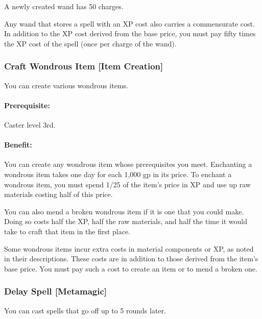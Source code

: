 A newly created wand has 50 charges.

Any wand that stores a spell with an XP cost also carries a commensurate cost. 
In addition to the XP cost derived from the base price, you must pay fifty times the XP cost of the spell (once per charge of the wand).

\subsubsection[Craft Wondrous Item]{Craft Wondrous Item [Item Creation]}
\label{Feat:CraftWondrousItem}
You can create various wondrous items.

\paragraph{Prerequisite:} Caster level 3rd.

\paragraph{Benefit:}
You can create any wondrous item whose prerequisites you meet. 
Enchanting a wondrous item takes one day for each 1,000 gp in its price. 
To enchant a wondrous item, you must spend 1/25 of the item's price in XP and use up raw materials costing half of this price.

You can also mend a broken wondrous item if it is one that you could make. 
Doing so costs half the XP, half the raw materials, and half the time it would take to craft that item in the first place.

Some wondrous items incur extra costs in material components or XP, as noted in their descriptions. 
These costs are in addition to those derived from the item’s base price. 
You must pay such a cost to create an item or to mend a broken one.

\subsubsection[Delay Spell]{Delay Spell [Metamagic]}
\label{Feat:DelaySpell}
You can cast spells that go off up to 5 rounds later.

